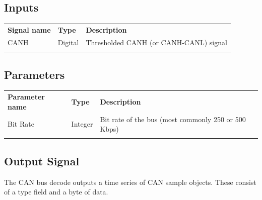 \subsection{Inputs}

\begin{tabularx}{16cm}{llX}
\thickhline
\textbf{Signal name} & \textbf{Type} & \textbf{Description} \\
\thickhline
CANH & Digital & Thresholded CANH (or CANH-CANL) signal \\
\thickhline
\end{tabularx}

\subsection{Parameters}

\begin{tabularx}{16cm}{llX}
\thickhline
\textbf{Parameter name} & \textbf{Type} & \textbf{Description} \\
\thickhline
Bit Rate & Integer & Bit rate of the bus (most commonly 250 or 500 Kbps)\\
\thickhline
\end{tabularx}

\subsection{Output Signal}

The CAN bus decode outputs a time series of CAN sample objects. These consist of a type field and a byte of data.


